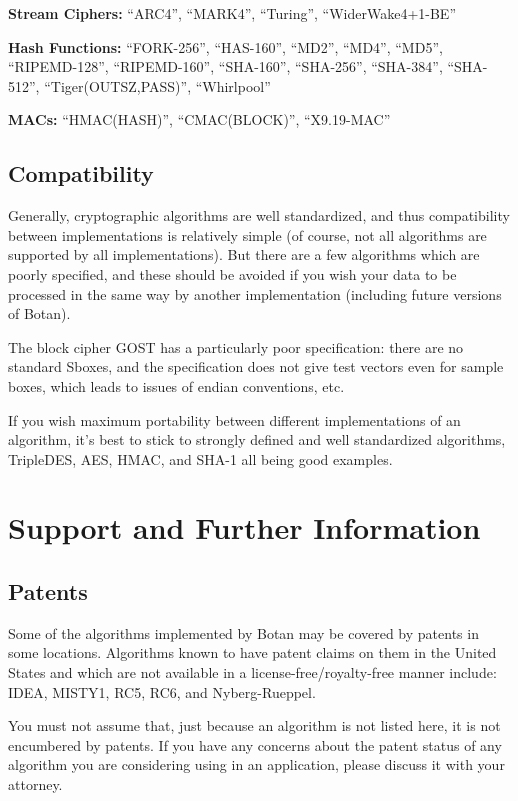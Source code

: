 \documentclass{article}
\begin{document}
\noindent
\textbf{Stream Ciphers:} ``ARC4'', ``MARK4'', ``Turing'', ``WiderWake4+1-BE''

\noindent
\textbf{Hash Functions:} ``FORK-256'', ``HAS-160'', ``MD2'', ``MD4'', ``MD5'',
``RIPEMD-128'', ``RIPEMD-160'', ``SHA-160'', ``SHA-256'', ``SHA-384'',
``SHA-512'', ``Tiger(OUTSZ,PASS)'', ``Whirlpool''

\noindent
\textbf{MACs:} ``HMAC(HASH)'', ``CMAC(BLOCK)'', ``X9.19-MAC''

\subsection{Compatibility}

Generally, cryptographic algorithms are well standardized, and thus
compatibility between implementations is relatively simple (of course, not all
algorithms are supported by all implementations). But there are a few
algorithms which are poorly specified, and these should be avoided if you wish
your data to be processed in the same way by another implementation (including
future versions of Botan).

The block cipher GOST has a particularly poor specification: there are no
standard Sboxes, and the specification does not give test vectors even for
sample boxes, which leads to issues of endian conventions, etc.

If you wish maximum portability between different implementations of an
algorithm, it's best to stick to strongly defined and well standardized
algorithms, TripleDES, AES, HMAC, and SHA-1 all being good examples.

\pagebreak
\section{Support and Further Information}

\subsection{Patents}

Some of the algorithms implemented by Botan may be covered by patents in some
locations. Algorithms known to have patent claims on them in the United States
and which are not available in a license-free/royalty-free manner include:
IDEA, MISTY1, RC5, RC6, and Nyberg-Rueppel.

You must not assume that, just because an algorithm is not listed here, it is
not encumbered by patents. If you have any concerns about the patent status of
any algorithm you are considering using in an application, please discuss it
with your attorney.
\end{document}
